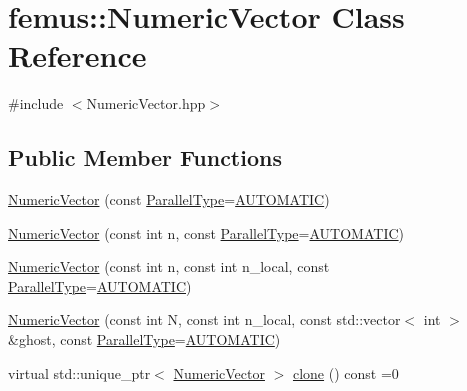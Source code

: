 \hypertarget{classfemus_1_1_numeric_vector}{}\section{femus\+:\+:Numeric\+Vector Class Reference}
\label{classfemus_1_1_numeric_vector}


{\ttfamily \#include $<$Numeric\+Vector.\+hpp$>$}

\subsection*{Public Member Functions}
\begin{DoxyCompactItemize}
\item 
\mbox{\hyperlink{classfemus_1_1_numeric_vector_a09f0db3964796d3984fad98c1ba4a556}{Numeric\+Vector}} (const \mbox{\hyperlink{_paralleltype_enum_8hpp_a55f694af2ca20b6481914237cf7e567c}{Parallel\+Type}}=\mbox{\hyperlink{_paralleltype_enum_8hpp_a55f694af2ca20b6481914237cf7e567ca0a831c2bc18e8354fe3e30ec0f3cdcda}{A\+U\+T\+O\+M\+A\+T\+IC}})
\item 
\mbox{\hyperlink{classfemus_1_1_numeric_vector_a9a909487a5d6e1a71b6b753975d02230}{Numeric\+Vector}} (const int n, const \mbox{\hyperlink{_paralleltype_enum_8hpp_a55f694af2ca20b6481914237cf7e567c}{Parallel\+Type}}=\mbox{\hyperlink{_paralleltype_enum_8hpp_a55f694af2ca20b6481914237cf7e567ca0a831c2bc18e8354fe3e30ec0f3cdcda}{A\+U\+T\+O\+M\+A\+T\+IC}})
\item 
\mbox{\hyperlink{classfemus_1_1_numeric_vector_a9a5466a53c14823beff01d3ac0ff95cf}{Numeric\+Vector}} (const int n, const int n\+\_\+local, const \mbox{\hyperlink{_paralleltype_enum_8hpp_a55f694af2ca20b6481914237cf7e567c}{Parallel\+Type}}=\mbox{\hyperlink{_paralleltype_enum_8hpp_a55f694af2ca20b6481914237cf7e567ca0a831c2bc18e8354fe3e30ec0f3cdcda}{A\+U\+T\+O\+M\+A\+T\+IC}})
\item 
\mbox{\hyperlink{classfemus_1_1_numeric_vector_abe38bc0d5251fdeddd0db1e7639d8d2a}{Numeric\+Vector}} (const int N, const int n\+\_\+local, const std\+::vector$<$ int $>$ \&ghost, const \mbox{\hyperlink{_paralleltype_enum_8hpp_a55f694af2ca20b6481914237cf7e567c}{Parallel\+Type}}=\mbox{\hyperlink{_paralleltype_enum_8hpp_a55f694af2ca20b6481914237cf7e567ca0a831c2bc18e8354fe3e30ec0f3cdcda}{A\+U\+T\+O\+M\+A\+T\+IC}})
\item 
virtual std\+::unique\+\_\+ptr$<$ \mbox{\hyperlink{classfemus_1_1_numeric_vector}{Numeric\+Vector}} $>$ \mbox{\hyperlink{classfemus_1_1_numeric_vector_a6d7f5742be5c8b7e6ac388b4ac62af17}{clone}} () const =0

\end{DoxyCompactItemize}

